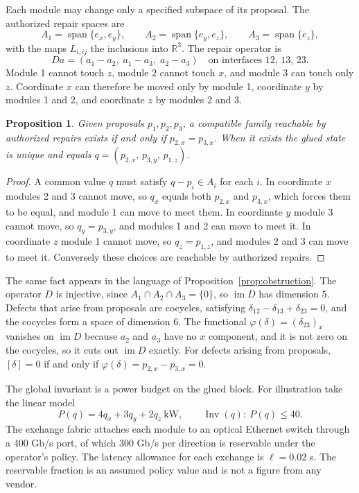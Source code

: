 \documentclass[11pt,openany]{book}
\newtheorem{proposition}{Proposition}[chapter]
\theoremstyle{remark}
\begin{document}
Each module may change only a specified subspace of its proposal. The authorized repair spaces are
\[
A_1=\operatorname{span}\{e_x,e_y\},\qquad A_2=\operatorname{span}\{e_y,e_z\},\qquad A_3=\operatorname{span}\{e_z\},
\]
with the maps $L_{i,ij}$ the inclusions into $\mathbb R^3$. The repair operator is
\[
Da=(a_1-a_2,\;a_1-a_3,\;a_2-a_3)\quad\text{on interfaces }12,\,13,\,23.
\]
Module 1 cannot touch $z$, module 2 cannot touch $x$, and module 3 can touch only $z$. Coordinate $x$ can therefore be moved only by module 1, coordinate $y$ by modules 1 and 2, and coordinate $z$ by modules 2 and 3.

\begin{proposition}\label{prop:example}
Given proposals $p_1,p_2,p_3$, a compatible family reachable by authorized repairs exists if and only if $p_{2,x}=p_{3,x}$. When it exists the glued state is unique and equals $q=(p_{2,x},\,p_{3,y},\,p_{1,z})$.
\end{proposition}
\begin{proof}
A common value $q$ must satisfy $q-p_i\in A_i$ for each $i$. In coordinate $x$ modules 2 and 3 cannot move, so $q_x$ equals both $p_{2,x}$ and $p_{3,x}$, which forces them to be equal, and module 1 can move to meet them. In coordinate $y$ module 3 cannot move, so $q_y=p_{3,y}$, and modules 1 and 2 can move to meet it. In coordinate $z$ module 1 cannot move, so $q_z=p_{1,z}$, and modules 2 and 3 can move to meet it. Conversely these choices are reachable by authorized repairs.
\end{proof}

The same fact appears in the language of Proposition~\ref{prop:obstruction}. The operator $D$ is injective, since $A_1\cap A_2\cap A_3=\{0\}$, so $\operatorname{im}D$ has dimension $5$. Defects that arise from proposals are cocycles, satisfying $\delta_{12}-\delta_{13}+\delta_{23}=0$, and the cocycles form a space of dimension $6$. The functional $\varphi(\delta)=(\delta_{23})_x$ vanishes on $\operatorname{im}D$ because $a_2$ and $a_3$ have no $x$ component, and it is not zero on the cocycles, so it cuts out $\operatorname{im}D$ exactly. For defects arising from proposals, $[\delta]=0$ if and only if $\varphi(\delta)=p_{2,x}-p_{3,x}=0$.

The global invariant is a power budget on the glued block. For illustration take the linear model
\[
P(q)=4q_x+3q_y+2q_z\ \text{kW},\qquad \operatorname{Inv}(q):\ P(q)\le 40.
\]
The exchange fabric attaches each module to an optical Ethernet switch through a 400 Gb/s port, of which 300 Gb/s per direction is reservable under the operator's policy. The latency allowance for each exchange is $\ell=0.02$ s. The reservable fraction is an assumed policy value and is not a figure from any vendor.
\end{document}
